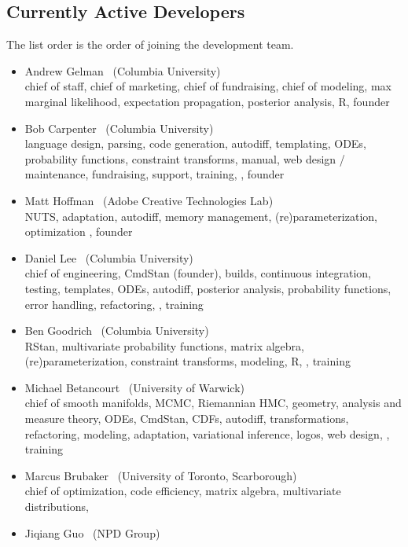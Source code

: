 \subsection*{Currently Active Developers}

The list order is the order of joining the development team.

\begin{itemize}
\item Andrew Gelman \ (Columbia University)
\\ {\footnotesize chief of staff, chief of marketing, chief of
  fundraising, chief of modeling, max marginal likelihood,
  expectation propagation,  posterior analysis, R, founder}
\item Bob Carpenter \ (Columbia University) \\ {\footnotesize language
    design, parsing, code generation, autodiff, templating, ODEs,
    probability functions, constraint transforms, manual, web design /
    maintenance, fundraising, support, training, \Cpp, founder}
\item Matt Hoffman \ (Adobe Creative Technologies Lab)
\\ {\footnotesize NUTS, adaptation, autodiff, memory management,
  (re)parameterization, optimization \Cpp, founder}
\item Daniel Lee \   (Columbia University)
\\ {\footnotesize chief of engineering, CmdStan (founder), builds, continuous
  integration, testing, templates, ODEs, autodiff,
  posterior analysis, probability functions, error handling,
  refactoring, \Cpp, training}
\item Ben Goodrich \   (Columbia University)
\\ {\footnotesize RStan, multivariate probability functions, matrix algebra,
  (re)parameterization, constraint transforms, modeling, R, \Cpp, training}
\item Michael Betancourt \ (University of Warwick) \\
  {\footnotesize chief of smooth manifolds, MCMC, Riemannian HMC,
    geometry, analysis and measure theory, ODEs, CmdStan, CDFs,
    autodiff, transformations, refactoring, modeling, adaptation, variational
    inference, logos, web design, \Cpp, training}
\item Marcus Brubaker \   (University of Toronto, Scarborough)
\\ {\footnotesize chief of optimization, code efficiency, matrix
  algebra, multivariate distributions, \Cpp}
\item Jiqiang Guo \   (NPD Group)

\end{itemize}
